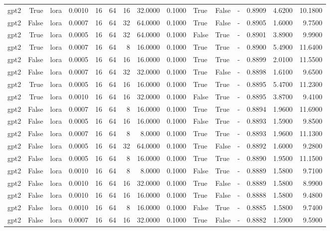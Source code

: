 \begin{tabular}{lrlrrrrrrlllrrr}
gpt2 & True & lora & 0.0010 & 16 & 64 & 16 & 32.0000 & 0.1000 & True & False & - & 0.8909 & 4.6200 & 10.1800 \\
gpt2 & False & lora & 0.0007 & 16 & 64 & 32 & 64.0000 & 0.1000 & True & False & - & 0.8905 & 1.6000 & 9.7500 \\
gpt2 & True & lora & 0.0005 & 16 & 64 & 32 & 64.0000 & 0.1000 & False & True & - & 0.8901 & 3.8900 & 9.9900 \\
gpt2 & True & lora & 0.0007 & 16 & 64 & 8 & 16.0000 & 0.1000 & True & True & - & 0.8900 & 5.4900 & 11.6400 \\
gpt2 & False & lora & 0.0005 & 16 & 64 & 16 & 16.0000 & 0.1000 & True & True & - & 0.8899 & 2.0100 & 11.5500 \\
gpt2 & False & lora & 0.0007 & 16 & 64 & 32 & 32.0000 & 0.1000 & True & False & - & 0.8898 & 1.6100 & 9.6500 \\
gpt2 & True & lora & 0.0005 & 16 & 64 & 16 & 16.0000 & 0.1000 & True & True & - & 0.8895 & 5.4700 & 11.2300 \\
gpt2 & True & lora & 0.0010 & 16 & 64 & 16 & 32.0000 & 0.1000 & False & True & - & 0.8895 & 3.8700 & 9.4100 \\
gpt2 & False & lora & 0.0007 & 16 & 64 & 8 & 16.0000 & 0.1000 & True & True & - & 0.8894 & 1.9600 & 11.6900 \\
gpt2 & False & lora & 0.0005 & 16 & 64 & 16 & 16.0000 & 0.1000 & False & True & - & 0.8893 & 1.5900 & 9.8500 \\
gpt2 & False & lora & 0.0007 & 16 & 64 & 8 & 8.0000 & 0.1000 & True & True & - & 0.8893 & 1.9600 & 11.1300 \\
gpt2 & False & lora & 0.0005 & 16 & 64 & 32 & 64.0000 & 0.1000 & True & False & - & 0.8892 & 1.6000 & 9.2800 \\
gpt2 & False & lora & 0.0005 & 16 & 64 & 8 & 16.0000 & 0.1000 & True & True & - & 0.8890 & 1.9500 & 11.1500 \\
gpt2 & False & lora & 0.0010 & 16 & 64 & 8 & 8.0000 & 0.1000 & False & True & - & 0.8889 & 1.5800 & 9.7100 \\
gpt2 & False & lora & 0.0010 & 16 & 64 & 16 & 32.0000 & 0.1000 & True & False & - & 0.8889 & 1.5800 & 8.9900 \\
gpt2 & False & lora & 0.0010 & 16 & 64 & 16 & 16.0000 & 0.1000 & True & False & - & 0.8888 & 1.5800 & 9.4800 \\
gpt2 & False & lora & 0.0010 & 16 & 64 & 8 & 16.0000 & 0.1000 & False & True & - & 0.8885 & 1.5800 & 9.7400 \\
gpt2 & False & lora & 0.0007 & 16 & 64 & 16 & 32.0000 & 0.1000 & True & False & - & 0.8882 & 1.5900 & 9.5900 \\

\end{tabular}
